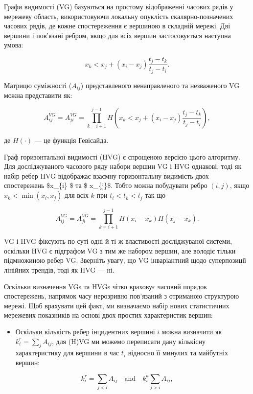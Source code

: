 \documentclass[
  letterpaper,
]{report}
\providecommand{\tightlist}{%
  \setlength{\itemsep}{0pt}\setlength{\parskip}{0pt}}\usepackage{longtable,booktabs,array}
\begin{document}
Графи видимості (VG) базуються на простому відображенні часових рядів у
мережеву область, використовуючи локальну опуклість скалярно-позначених
часових рядів, де кожне спостереження є вершиною в складній мережі. Дві
вершини і пов'язані ребром, якщо для всіх вершин застосовується наступна
умова:

\[ 
x_{k} < x_{j} + \left( x_{i} - x_{j} \right) \frac{t_{j}-t_{k}}{t_{j}-t_{i}}. 
\]

Матрицю суміжності (\(A_{ij}\)) представленого ненаправленого та
незваженого VG можна представити як:

\[ 
A_{ij}^{VG} = A_{ji}^{VG} = \prod_{k=i+1}^{j-1} H \left( x_{k} < x_{j} + \left( x_{i} - x_{j} \right) \frac{t_{j}-t_{k}}{t_{j}-t_{i}} \right), 
\]

де \(H( \cdot )\) --- це функція Гевісайда.

Граф горизонтальної видимості (HVG) є спрощеною версією цього алгоритму.
Для досліджуваного часового ряду набори вершин VG і HVG однакові, тоді
як набір ребер HVG відображає взаємну горизонтальну видимість двох
спостережень \$x\_\{i\} \$ та \$ x\_\{j\}\$. Тобто можна побудувати
ребро \((i,j)\), якщо \(x_{k} < \min(x_{i}, x_{j})\) для всіх \(k\) при
\(t_{i} < t_{k} < t_{j}\) так що

\[ 
A_{ij}^{VG} = A_{ji}^{VG} = \prod_{k=i+1}^{j-1} H \left( x_{i} - x_{k} \right) H \left( x_{j} - x_{k} \right). 
\]

VG і HVG фіксують по суті одні й ті ж властивості досліджуваної системи,
оскільки HVG є підграфом VG з тим же набором вершин, але володіє тільки
підмножиною ребер VG. Зверніть увагу, що VG інваріантний щодо
суперпозиції лінійних трендів, тоді як HVG --- ні.

Оскільки визначення VGs та HVGs чітко враховує часовий порядок
спостережень, напрямок часу нерозривно пов'язаний з отриманою структурою
мережі. Щоб врахувати цей факт, ми визначаємо набір нових статистичних
мережевих показників на основі двох простих характеристик вершин:

\begin{itemize}
\tightlist
\item
  Оскільки кількість ребер інцидентних вершині \(i\) можна визначити як
  \(k_{i}^{r} = \sum_{j} A_{ij}\), для (H)VG ми можемо переписати дану
  кількісну характеристику для вершини в час \(t_{i}\) відносно її
  минулих та майбутніх вершин:
\end{itemize}

\[ 
k_{i}^{r} = \sum_{j<i} A_{ij} \quad \mathrm{and} \quad k_{i}^{a} \sum_{j>i} A_{ij}, 
\]
\end{document}
